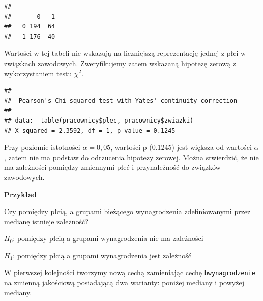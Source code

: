 \documentclass[
]{book}
\newenvironment{Shaded}{\begin{snugshade}}{\end{snugshade}}
\newcommand{\DataTypeTok}[1]{\textcolor[rgb]{0.13,0.29,0.53}{#1}}
\newcommand{\KeywordTok}[1]{\textcolor[rgb]{0.13,0.29,0.53}{\textbf{#1}}}
\newcommand{\NormalTok}[1]{#1}
\newcommand{\OperatorTok}[1]{\textcolor[rgb]{0.81,0.36,0.00}{\textbf{#1}}}
\newcommand{\OtherTok}[1]{\textcolor[rgb]{0.56,0.35,0.01}{#1}}
\newcommand{\StringTok}[1]{\textcolor[rgb]{0.31,0.60,0.02}{#1}}
\begin{document}
\begin{verbatim}
##    
##       0   1
##   0 194  64
##   1 176  40
\end{verbatim}

Wartości w tej tabeli nie wskazują na liczniejszą reprezentację jednej z płci w związkach zawodowych. Zweryfikujemy zatem wskazaną hipotezę zerową z wykorzystaniem testu \(\chi^2\).

\begin{Shaded}
\end{Shaded}

\begin{verbatim}
## 
##  Pearson's Chi-squared test with Yates' continuity correction
## 
## data:  table(pracownicy$plec, pracownicy$zwiazki)
## X-squared = 2.3592, df = 1, p-value = 0.1245
\end{verbatim}

Przy poziomie istotności \(\alpha = 0,05\), wartości p (0.1245) jest większa od wartości \(\alpha\), zatem nie ma podstaw do odrzucenia hipotezy zerowej. Można stwierdzić, że nie ma zależności pomiędzy zmiennymi płeć i przynależność do związków zawodowych.

\textbf{Przykład}

Czy pomiędzy płcią, a grupami bieżącego wynagrodzenia zdefiniowanymi przez medianę istnieje zależność?

\(H_0\): pomiędzy płcią a grupami wynagrodzenia nie ma zależności

\(H_1\): pomiędzy płcią a grupami wynagrodzenia jest zależność

W pierwszej kolejności tworzymy nową cechą zamieniając cechę \texttt{bwynagrodzenie} na zmienną jakościową posiadającą dwa warianty: poniżej mediany i powyżej mediany.

\begin{Shaded}
\end{Shaded}
\end{document}
